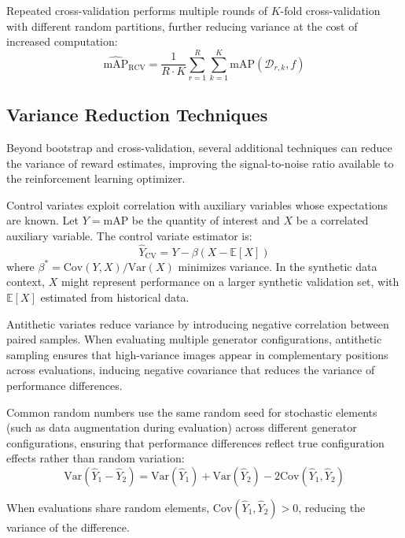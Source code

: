 Repeated cross-validation performs multiple rounds of $K$-fold cross-validation with different random partitions, further reducing variance at the cost of increased computation:
\begin{equation}
\widehat{\text{mAP}}_{\text{RCV}} = \frac{1}{R \cdot K} \sum_{r=1}^{R} \sum_{k=1}^{K} \text{mAP}(\mathcal{D}_{r,k}, f)
\label{eq:repeated_cv}
\end{equation}

\subsection{Variance Reduction Techniques}

Beyond bootstrap and cross-validation, several additional techniques can reduce the variance of reward estimates, improving the signal-to-noise ratio available to the reinforcement learning optimizer.

Control variates exploit correlation with auxiliary variables whose expectations are known. Let $Y = \text{mAP}$ be the quantity of interest and $X$ be a correlated auxiliary variable. The control variate estimator is:
\begin{equation}
\hat{Y}_{\text{CV}} = Y - \beta(X - \mathbb{E}[X])
\label{eq:control_variate}
\end{equation}
where $\beta^* = \text{Cov}(Y, X) / \text{Var}(X)$ minimizes variance. In the synthetic data context, $X$ might represent performance on a larger synthetic validation set, with $\mathbb{E}[X]$ estimated from historical data.

Antithetic variates reduce variance by introducing negative correlation between paired samples. When evaluating multiple generator configurations, antithetic sampling ensures that high-variance images appear in complementary positions across evaluations, inducing negative covariance that reduces the variance of performance differences.

Common random numbers use the same random seed for stochastic elements (such as data augmentation during evaluation) across different generator configurations, ensuring that performance differences reflect true configuration effects rather than random variation:
\begin{equation}
\text{Var}(\hat{Y}_1 - \hat{Y}_2) = \text{Var}(\hat{Y}_1) + \text{Var}(\hat{Y}_2) - 2\text{Cov}(\hat{Y}_1, \hat{Y}_2)
\label{eq:common_random_numbers}
\end{equation}

When evaluations share random elements, $\text{Cov}(\hat{Y}_1, \hat{Y}_2) > 0$, reducing the variance of the difference.

